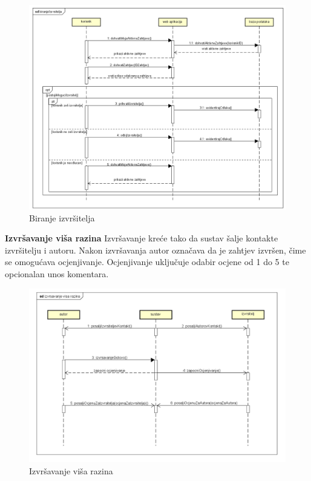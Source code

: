 				
				\begin{figure}[H]
					\includegraphics[scale=0.6]{slike/biranje-izvrsitelja.png} %
					\centering
					\caption{Biranje izvršitelja}
				\end{figure}
				\newpage
				
				\noindent \large {\textbf{Izvršavanje viša razina}}
				\newline
				\noindent \normalsize Izvršavanje kreće tako da sustav šalje kontakte izvršitelju i autoru. Nakon izvršavanja autor označava da je zahtjev izvršen, čime se omogućava ocjenjivanje. Ocjenjivanje uključuje odabir ocjene od 1 do 5 te opcionalan unos komentara.
				   
							
				\begin{figure}[H]
					\includegraphics[scale=0.65]{slike/izvrsavanje-visa-razina.png} %
					\centering
					\caption{Izvršavanje viša razina}
				\end{figure}
				

